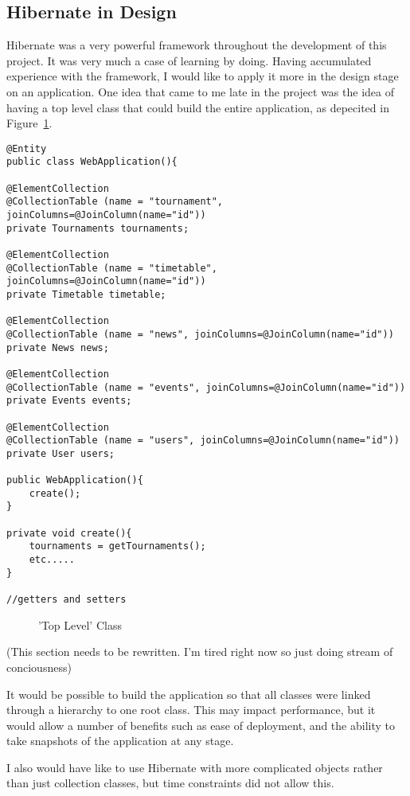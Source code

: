 \subsection{Hibernate in Design}
Hibernate was a very powerful framework throughout the development of this project. It was very much a case of learning by doing. Having accumulated experience with the framework, I would like to apply it more in the design stage on an application. One idea that came to me late in the project was the idea of having a top level class that could build the entire application, as depecited in Figure~\ref{fig:toplevel}.


\begin{lstlisting}
@Entity
public class WebApplication(){

@ElementCollection
@CollectionTable (name = "tournament", joinColumns=@JoinColumn(name="id"))
private Tournaments tournaments;

@ElementCollection
@CollectionTable (name = "timetable", joinColumns=@JoinColumn(name="id"))
private Timetable timetable;

@ElementCollection
@CollectionTable (name = "news", joinColumns=@JoinColumn(name="id"))
private News news;

@ElementCollection
@CollectionTable (name = "events", joinColumns=@JoinColumn(name="id"))
private Events events;

@ElementCollection
@CollectionTable (name = "users", joinColumns=@JoinColumn(name="id"))
private User users;

public WebApplication(){
	create();
}

private void create(){
	tournaments = getTournaments();
	etc.....
}

//getters and setters

\end{lstlisting}
\begin{figure}[H]
\caption{'Top Level' Class}
\label{fig:toplevel}
\end{figure}

(This section needs to be rewritten. I'm tired right now so just doing stream of conciousness) 

It would be possible to build the application so that all classes were linked through a hierarchy to one root class. This may impact performance, but it would allow a number of benefits such as ease of deployment, and the ability to take snapshots of the application at any stage.

I also would have like to use Hibernate with more complicated objects rather than just collection classes, but time constraints did not allow this.

